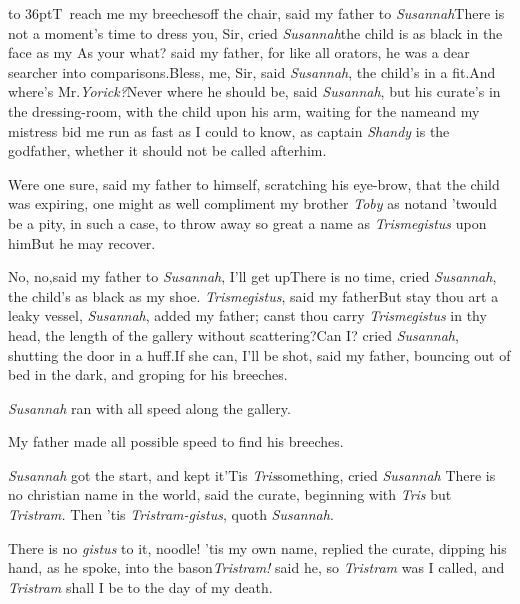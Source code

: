 \documentclass{article}
\begin{document}
\lettrine{\hbox to 36pt{\hskip -3pt\Tsk T}}{\,}
reach me my breeches\break off
the chair, said my father to \textit{Susannah}\tsh There is not a
moment’s time to dress you, Sir, cried
\textit{Susannah}\tsk the child is as black in the face as
my\tsh{} As your what? said my father, for like all orators,
he was a dear searcher into comparisons.\tsk Bless, me, Sir, said
\textit{Susannah}, the child’s in a fit.\tsk And
where’s Mr.\@ \textit{Yorick?}\tsk Never where he should be,
said \textit{Susannah}, but his curate’s in the dressing-room,
with the child upon his arm, waiting for the name\tsk and my
mistress bid me run as fast as I could to know, as captain
\textit{Shandy} is the godfather, whether it should not be called
after\break him.

Were one sure, said my father to himself, scratching his
eye-brow, that the child was expiring, one might as well compliment
my brother \textit{Toby} as not\tsk\break and ’twould be a pity, in
such a case, to throw away so great a name as
\textit{Trismegistus} upon him\tsk But he may
recover.

No, no,\tsk said my father to \textit{Susannah},
I’ll get up\tsk There is no time, cried\break
\textit{Susannah}, the child’s as black as my shoe.
\textit{Trismegistus}, said my father\tsk But
stay\break
\tsk thou art a leaky vessel, \textit{Susannah}, added my
father; canst thou carry \textit{Trismegistus} in thy head, the
length of the gallery without scattering?\tsk Can I? cried
\textit{Susannah}, shutting the door in a huff.\tsk If she
can, I’ll be shot, said my father, bouncing out of bed in the
dark, and groping for his breeches.

\textit{Susannah} ran with all speed along the gallery.

My father made all possible speed to find his breeches.

\textit{Susannah} got the start, and kept it\tsk ’Tis
\textit{Tris}\tsk something, cried \textit{Susannah}\tsk{}
There is no christian name in the world, said the curate, beginning with
\textit{Tris}\tsk\break
but \textit{Tristram.} Then ’tis
\textit{Tristram-gistus}, quoth \textit{Susannah}.

\tsk There is no \textit{gistus} to it, noodle!\tsk\break
’tis my own name, replied the curate,
dipping his hand, as he spoke, into the\break
bason\tsk \textit{Tristram!} said he, \etc \etc \etc
\etc so \textit{Tristram} was I called, and \textit{Tristram}
shall I be to the day of my death.
\end{document}
